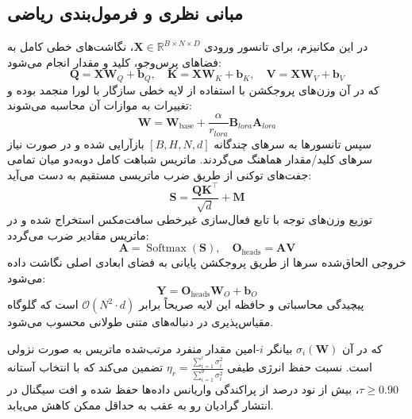 \subsection{مبانی نظری و فرمول‌بندی ریاضی}
در این مکانیزم، برای تانسور ورودی $\mathbf{X} \in \mathbb{R}^{B \times N \times D}$، نگاشت‌های خطی کامل به فضاهای پرس‌وجو، کلید و مقدار انجام می‌شود:
\begin{equation}
\mathbf{Q} = \mathbf{X} \mathbf{W}_Q + \mathbf{b}_Q, \quad \mathbf{K} = \mathbf{X} \mathbf{W}_K + \mathbf{b}_K, \quad \mathbf{V} = \mathbf{X} \mathbf{W}_V + \mathbf{b}_V
\end{equation}
که در آن وزن‌های پروجکشن با استفاده از لایه خطی سازگار با لورا منجمد بوده و تغییرات به موازات آن محاسبه می‌شوند:
\begin{equation}
\mathbf{W} = \mathbf{W}_{\text{base}} + \frac{\alpha}{r_{lora}} \mathbf{B}_{lora} \mathbf{A}_{lora}
\end{equation}
سپس تانسورها به سرهای چندگانه $[B, H, N, d]$ بازآرایی شده و در صورت نیاز سرهای کلید/مقدار هماهنگ می‌گردند. ماتریس شباهت کامل دو‌به‌دو میان تمامی جفت‌های توکنی از طریق ضرب ماتریسی مستقیم به دست می‌آید:
\begin{equation}
\mathbf{S} = \frac{\mathbf{Q} \mathbf{K}^\top}{\sqrt{d}} + \mathbf{M}
\end{equation}
توزیع وزن‌های توجه با تابع فعال‌سازی غیرخطی سافت‌مکس استخراج شده و در ماتریس مقادیر ضرب می‌گردد:
\begin{equation}
\mathbf{A} = \operatorname{Softmax}(\mathbf{S}), \quad \mathbf{O}_{\text{heads}} = \mathbf{A} \mathbf{V}
\end{equation}
خروجی الحاق‌شده سرها از طریق پروجکشن پایانی به فضای ابعادی اصلی نگاشت داده می‌شود:
\begin{equation}
\mathbf{Y} = \mathbf{O}_{\text{heads}} \mathbf{W}_O + \mathbf{b}_O
\end{equation}
پیچیدگی محاسباتی و حافظه این لایه صریحاً برابر $\mathcal{O}(N^2 \cdot d)$ است که گلوگاه مقیاس‌پذیری در دنباله‌های متنی طولانی محسوب می‌شود.

که در آن $\sigma_i(\mathbf{W})$ بیانگر $i$-امین مقدار منفرد مرتب‌شده ماتریس به صورت نزولی است. نسبت حفظ انرژی طیفی $\eta_r = \frac{\sum_{i=1}^r \sigma_i^2}{\sum_{i=1}^{d} \sigma_i^2}$ تضمین می‌کند که با انتخاب آستانه $\tau \ge 0.90$، بیش از نود درصد از پراکندگی واریانس داده‌ها حفظ شده و افت سیگنال در انتشار گرادیان رو به عقب به حداقل ممکن کاهش می‌یابد.

